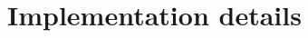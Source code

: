 \documentclass[a4paper]{report}
\begin{document}
%
%
%
%
%
%
%

\section{Implementation details}
\label{subsec:impl}
\end{document}
